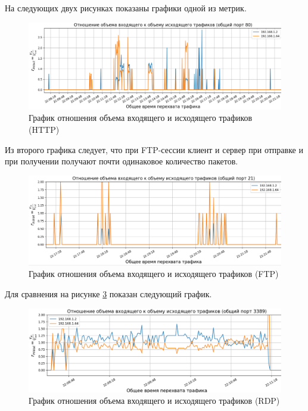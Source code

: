 \documentclass[spec, och, diploma]{SCWorks}
\begin{document}
На следующих двух рисунках показаны графики одной из метрик. 



\begin{figure}[H]
  \centering
  \includegraphics[width=1.0\textwidth]{pics/newhttp1.png}
  \caption{График отношения объема входящего и исходящего трафиков (HTTP)}
  \label{httpg1}
\end{figure}

Из второго графика следует, что при FTP-сессии клиент и сервер при отправке и при получении получают почти одинаковое 
количество пакетов.


\begin{figure}[H]
  \centering
  \includegraphics[width=1.0\textwidth]{pics/newftp1.png}
  \caption{График отношения объема входящего и исходящего трафиков (FTP)}
  \label{ftpg1}
\end{figure}

Для сравнения на рисунке \ref{rdpg1} показан следующий график.

\begin{figure}[H]
  \centering
  \includegraphics[width=1.0\textwidth]{pics/newrdp1.png}
  \caption{График отношения объема входящего и исходящего трафиков (RDP)}
  \label{rdpg1}
\end{figure}
\end{document}
